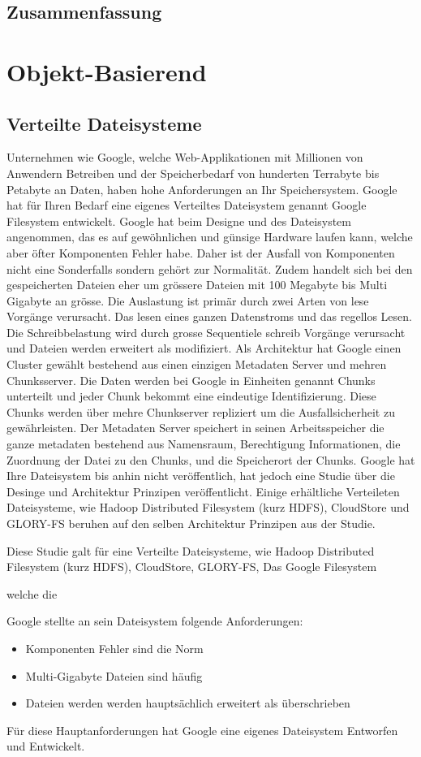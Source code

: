 \subsection{Zusammenfassung}


\section{Objekt-Basierend}

\subsection{Verteilte Dateisysteme}
Unternehmen wie Google, welche Web-Applikationen mit Millionen von Anwendern Betreiben und der Speicherbedarf von hunderten Terrabyte bis Petabyte an Daten,  haben hohe Anforderungen an Ihr Speichersystem. Google hat für Ihren Bedarf eine eigenes Verteiltes Dateisystem genannt Google Filesystem entwickelt. Google hat beim Designe und des Dateisystem angenommen, das es auf gewöhnlichen und günsige Hardware laufen kann, welche aber öfter Komponenten Fehler habe. Daher ist der Ausfall von Komponenten nicht eine Sonderfalls sondern gehört zur Normalität. Zudem handelt sich bei den gespeicherten Dateien eher um grössere Dateien mit 100 Megabyte bis Multi Gigabyte an grösse. Die Auslastung ist primär durch zwei Arten von lese Vorgänge verursacht. Das lesen eines ganzen Datenstroms und das regellos Lesen. Die Schreibbelastung wird durch grosse Sequentiele schreib Vorgänge verursacht und Dateien werden erweitert als modifiziert. Als Architektur hat Google einen Cluster gewählt bestehend aus einen einzigen Metadaten Server und mehren Chunksserver. Die Daten werden bei Google in Einheiten genannt Chunks unterteilt und jeder Chunk bekommt eine eindeutige Identifizierung. Diese Chunks werden über mehre Chunkserver repliziert um die Ausfallsicherheit zu gewährleisten. Der Metadaten Server speichert in seinen Arbeitsspeicher die ganze metadaten bestehend aus Namensraum, Berechtigung Informationen, die Zuordnung der Datei zu den Chunks, und die Speicherort der Chunks. Google hat Ihre Dateisystem bis anhin nicht veröffentlich, hat jedoch eine  Studie über die Desinge und Architektur Prinzipen veröffentlicht. Einige erhältliche Verteileten Dateisysteme, wie Hadoop Distributed Filesystem (kurz HDFS), CloudStore und GLORY-FS beruhen auf den selben Architektur Prinzipen aus der Studie.


 Diese Studie galt für eine Verteilte Dateisysteme, wie Hadoop Distributed Filesystem (kurz HDFS), CloudStore, GLORY-FS,
 Das Google Filesystem 

welche die


 Google stellte an sein Dateisystem folgende Anforderungen: 
\begin{itemize}
\item Komponenten Fehler sind die Norm
\item Multi-Gigabyte Dateien sind häufig
\item Dateien werden werden hauptsächlich erweitert als überschrieben
\end{itemize}

Für diese Hauptanforderungen hat Google eine eigenes Dateisystem Entworfen und Entwickelt.


